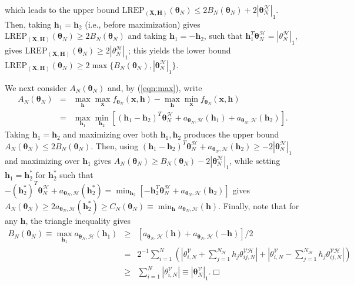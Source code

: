 \documentclass[12pt]{article}
\theoremstyle{definition}
\newcommand{\REP}{\mathrm{LREP}}
\newcommand{\elt}{A_{N}(\boldsymbol \theta_N) }
\newcommand{\Gam}{B_{N}(\boldsymbol \theta_N) }
\newcommand{\Gamc}{C_{N}(\boldsymbol \theta_N) }
\begin{document}
which leads to the upper bound $ \REP_{(\boldsymbol X, \boldsymbol H)}(\boldsymbol \theta_N) \leq 2 \Gam + 2 |\boldsymbol \theta_N^{\mathcal{H}} |_1$.  Then, taking $\boldsymbol h_1=\boldsymbol h_2$ (i.e., before maximization) gives $\REP_{(\boldsymbol X, \boldsymbol H)}(\boldsymbol \theta_N)
\geq 2\Gam$ and taking $\boldsymbol h_1=-\boldsymbol h_2$, such that  $\boldsymbol h_1^T \boldsymbol \theta_N^{\mathcal{H}} = |\theta_N^{\mathcal{H}}|_1$, gives $\REP_{(\boldsymbol X, \boldsymbol H)}(\boldsymbol \theta_N)
\geq 2|\theta_N^{\mathcal{H}}|_1 $; this yields the lower bound $\REP_{(\boldsymbol X, \boldsymbol H)}(\boldsymbol \theta_N)\geq 2\max\{\Gam,  |\boldsymbol \theta_N^{\mathcal{H}} |_1\}$.

We next consider $\elt$ and, by (\ref{eqn:max}), write
\begin{eqnarray*}
\elt &=&  \max_{\boldsymbol h}\max_{\boldsymbol x}f_{\boldsymbol \theta_N} (\boldsymbol x , \boldsymbol h) -  \max_{\boldsymbol h}\min_{\boldsymbol x}f_{\boldsymbol \theta_N} (\boldsymbol x , \boldsymbol h)\\&=&
   \max_{\boldsymbol h_1 }  \min_{\boldsymbol h_2 }\left[ (\boldsymbol h_1 - \boldsymbol h_2)^T \boldsymbol \theta_N^{\mathcal{H}}  +   a_{\boldsymbol \theta_N, \mathcal{H}} (\boldsymbol h_1)  + a_{\boldsymbol \theta_N, \mathcal{H}} (\boldsymbol h_2)\right].
\end{eqnarray*}
Taking $\boldsymbol h_1=\boldsymbol h_2$  and maximizing over both $\boldsymbol h_1,\boldsymbol h_2$ produces the upper bound
$\elt \leq 2\Gam$. Then, using $ (\boldsymbol h_1 - \boldsymbol h_2)^T \boldsymbol \theta_N^{\mathcal{H}}+ a_{\boldsymbol \theta_N, \mathcal{H}} (\boldsymbol h_2) \geq - 2|\boldsymbol \theta_N^{\mathcal{H}} |_1$ and maximizing over   $\boldsymbol h_1$ gives
$\elt \geq  \Gam- 2|\boldsymbol \theta_N^{\mathcal{H}} |_1$, while setting $\boldsymbol h_1=\boldsymbol h_2^*$
for $\boldsymbol h_2^*$ such that  $
  - (\boldsymbol h_2^*) ^T \boldsymbol \theta_N^{\mathcal{H}}  +     a_{\boldsymbol \theta_N, \mathcal{H}} (\boldsymbol h_2^*) = \min_{\boldsymbol h_2} [ -  \boldsymbol h_2  ^T \boldsymbol \theta_N^{\mathcal{H}}  +     a_{\boldsymbol \theta_N, \mathcal{H}} (\boldsymbol h_2)]$ gives
  $\elt \geq 2   a_{\boldsymbol \theta_N, \mathcal{H}} (\boldsymbol h_2^*) \geq \Gamc \equiv \min_{\boldsymbol h}  a_{\boldsymbol \theta_N, \mathcal{H}} (\boldsymbol h)  $. Finally, note that for any $\boldsymbol h$, the triangle inequality gives
  \begin{eqnarray*}
  \Gam  \equiv \max_{\boldsymbol h_1}  a_{\boldsymbol \theta_N, \mathcal{H}} (\boldsymbol h_1) &\geq&
  [a_{\boldsymbol \theta_N, \mathcal{H}} (\boldsymbol h)  + a_{\boldsymbol \theta_N, \mathcal{H}} (-\boldsymbol h)]/2\\
  &=&
    2^{-1}\sum_{i=1}^{N } \left(\left| \theta_{i,N}^{\mathcal{V}}   + \sum_{j=1}^{N_{\mathcal{H}}} h_j \theta_{ij,N}^{\mathcal{VH}} \right|
   + \left| \theta_{i,N}^{\mathcal{V}}   - \sum_{j=1}^{N_{\mathcal{H}}} h_j \theta_{ij,N}^{\mathcal{VH}} \right|\right)\\
   & \geq &\sum_{i=1}^{N }  \left| \theta_{i,N}^{\mathcal{V}} \right| \equiv |\boldsymbol \theta_{N}^{\mathcal{V}}|_1. \Box\\\end{eqnarray*}
\end{document}
